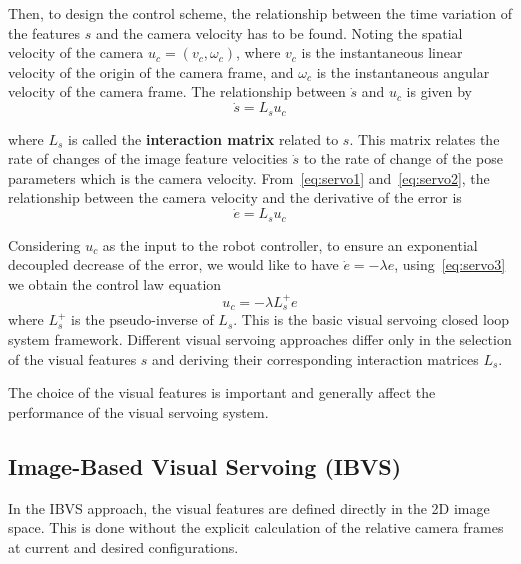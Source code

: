 Then, to design the control scheme, the relationship between the time variation of the features $s$ and the camera velocity has to be found. Noting the spatial velocity of the camera $u_c = (v_c, \omega_c)$, where $v_c$ is the instantaneous linear velocity of the origin of the camera frame, and $\omega_c$ is the instantaneous angular velocity of the camera frame. The relationship between $\dot{s}$ and $u_c$ is given by
\begin{equation}
  \dot{s} = L_s u_c
  \label{eq:servo2}
\end{equation}

where $L_s$ is called the \textbf{interaction matrix} related to $s$. This matrix relates the rate of changes of the image feature velocities $\dot{s}$ to the rate of change of the pose parameters which is the camera velocity. From~\ref{eq:servo1} and~\ref{eq:servo2}, the relationship between the camera velocity and the derivative of the error is
\begin{equation}
  \dot{e} = L_s u_c
\label{eq:servo3}
\end{equation}

Considering $u_c$ as the input to the robot controller, to ensure an exponential decoupled decrease of the error, we would like to have $\dot{e} = -\lambda e$, using~\ref{eq:servo3} we obtain the control law equation
\begin{equation}
  u_c = -\lambda L_{s}^{+} e
\label{eq:servo4}
\end{equation}
where $L_{s}^{+}$ is the pseudo-inverse of $L_s$. This is the basic visual servoing closed loop system framework. Different visual servoing approaches differ only in the selection of the visual features $s$ and deriving their corresponding interaction matrices $L_s$.

The choice of the visual features is important and generally affect the performance of the visual servoing system.

\subsection{Image-Based Visual Servoing (IBVS)}
In the IBVS approach, the visual features are defined directly in the 2D image space. This is done without the explicit calculation of the relative camera frames at current and desired configurations.

